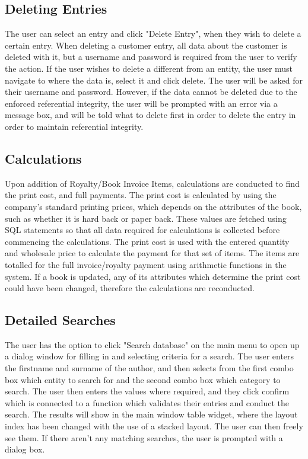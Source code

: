 \subsection{Deleting Entries}

The user can select an entry and click "Delete Entry", when they wish to delete a certain entry. When deleting a customer entry, all data about the customer is deleted with it, but a username and password is required from the user to verify the action. If the user wishes to delete a different from an entity, the user must navigate to where the data is, select it and click delete. The user will be asked for their username and password. However, if the data cannot be deleted due to the enforced referential integrity, the user will be prompted with an error via a message box, and will be told what to delete first in order to delete the entry in order to maintain referential integrity.

\subsection{Calculations}

Upon addition of Royalty/Book Invoice Items, calculations are conducted to find the print cost, and full payments. The print cost is calculated by using the company's standard printing prices, which depends on the attributes of the book, such as whether it is hard back or paper back. These values are fetched using SQL statements so that all data required for calculations is collected before commencing the calculations. The print cost is used with the entered quantity and wholesale price to calculate the payment for that set of items. The items are totalled for the full invoice/royalty payment using arithmetic functions in the system. If a book is updated, any of its attributes which determine the print cost could have been changed, therefore the calculations are reconducted.

\subsection{Detailed Searches}

The user has the option to click "Search database" on the main menu to open up a dialog window for filling in and selecting criteria for a search. The user enters the firstname and surname of the author, and then selects from the first combo box which entity to search for and the second combo box which category to search. The user then enters the values where required, and they click confirm which is connected to a function which validates their entries and conduct the search. The results will show in the main window table widget, where the layout index has been changed with the use of a stacked layout. The user can then freely see them. If there aren't any matching searches, the user is prompted with a dialog box.


